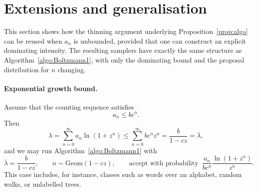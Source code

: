 \documentclass[a4paper,10pt]{article}
\theoremstyle{definition}
\begin{document}
\section{Extensions and generalisation} \label{sec:extension}
This section shows how the thinning argument underlying Proposition~\ref{prop:algo} can be reused when $a_n$ is unbounded, provided that one can construct an explicit dominating intensity. The resulting samplers have exactly the same structure as Algorithm~\ref{algo:Boltzmann1}, with only the dominating bound and the proposal distribution for $n$ changing.

\paragraph{Exponential growth bound.}
Assume that the counting sequence satisfies
\begin{equation*}
    a_n \leq bc^n.
\end{equation*}
Then
\begin{equation*}
    \lambda = \sum_{n=0}^\infty a_n\ln(1+z^n) \leq \sum_{n=0}^\infty bc^n z^n=\frac{b}{1-cz}=\overline{\lambda},
\end{equation*}
and we may run Algorithm~\ref{algo:Boltzmann1} with
\begin{equation*}
    \overline{\lambda}=\frac{b}{1-cz},\qquad n\sim \mathrm{Geom}(1-cz),\qquad \text{accept with probability }\ \frac{a_n}{bc^n}\frac{\ln(1+z^n)}{z^n}.
\end{equation*}
This case includes, for instance, classes such as words over an alphabet, random walks, or unlabelled trees.
\end{document}
